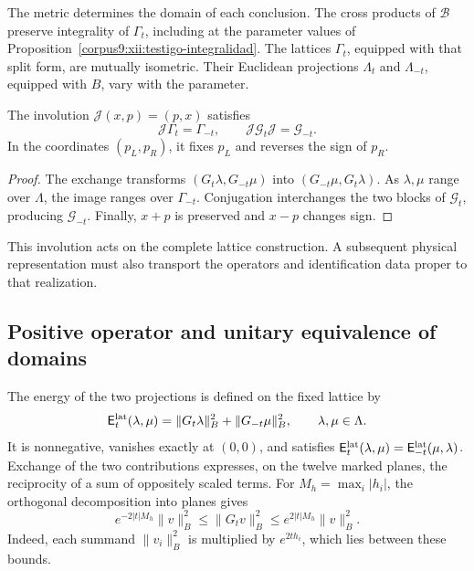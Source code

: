 The metric determines the domain of each conclusion. The cross products
of \(\mathcal B\) preserve integrality of \(\Gamma_t\), including
at the parameter values of
Proposition~\ref{corpus9:xii:testigo-integralidad}. The lattices
\(\Gamma_t\), equipped with that split form, are mutually isometric.
Their Euclidean projections \(\Lambda_t\) and \(\Lambda_{-t}\),
equipped with \(B\), vary with the parameter.

\begin{proposition}
\label{corpus9:xii:involucion-partida}
The involution \(\mathcal J(x,p)=(p,x)\) satisfies
\[
 \mathcal J\Gamma_t=\Gamma_{-t},\qquad
 \mathcal J\mathcal G_t\mathcal J=\mathcal G_{-t}.
\]
In the coordinates \((p_L,p_R)\), it fixes \(p_L\) and reverses
the sign of \(p_R\).
\end{proposition}
\begin{proof}
The exchange transforms \((G_t\lambda,G_{-t}\mu)\) into
\((G_{-t}\mu,G_t\lambda)\). As \(\lambda,\mu\) range over
\(\Lambda\), the image ranges over \(\Gamma_{-t}\). Conjugation
interchanges the two blocks of \(\mathcal G_t\), producing
\(\mathcal G_{-t}\). Finally, \(x+p\) is preserved and \(x-p\)
changes sign.
\end{proof}

This involution acts on the complete lattice construction. A subsequent
physical representation must also transport the operators and
identification data proper to that realization.

\subsection{Positive operator and unitary equivalence of domains}
\label{corpus9:xii:energia-reticular}

The energy of the two projections is defined on the fixed lattice by
\begin{equation}
 \mathsf E_t^{\rm lat}(\lambda,\mu)
 =\|G_t\lambda\|_B^2+\|G_{-t}\mu\|_B^2,
 \qquad \lambda,\mu\in\Lambda.
 \label{corpus9:xii:energia}
\end{equation}
It is nonnegative, vanishes exactly at \((0,0)\), and satisfies
\(\mathsf E_t^{\rm lat}(\lambda,\mu)
=\mathsf E_{-t}^{\rm lat}(\mu,\lambda)\). Exchange of the two
contributions expresses, on the twelve marked planes, the reciprocity
of a sum of oppositely scaled terms. For \(M_h=\max_i|h_i|\), the
orthogonal decomposition into planes gives
\begin{equation}
 e^{-2|t|M_h}\|v\|_B^2\leq\|G_tv\|_B^2
                    \leq e^{2|t|M_h}\|v\|_B^2.
 \label{corpus9:xii:cotas-cuadraticas}
\end{equation}
Indeed, each summand \(\|v_i\|_B^2\) is multiplied by
\(e^{2th_i}\), which lies between these bounds.

